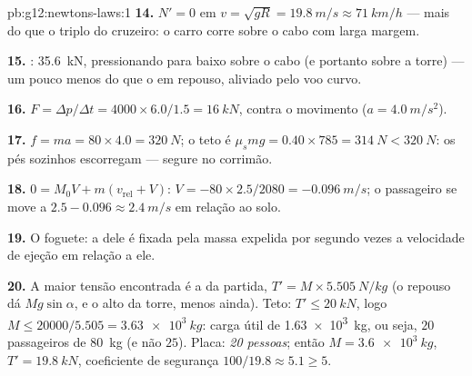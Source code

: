 \begin{solution}{pb:g12:newtons-laws:1}
\textbf{14.} $N' = 0$ em $v = \sqrt{gR} = \qty{19.8}{m/s} \approx
\qty{71}{km/h}$ --- mais do que o triplo do cruzeiro: o carro corre
sobre o cabo com larga margem.

\textbf{15.} : \qty{35.6}{kN}, pressionando para
baixo sobre o cabo (e portanto sobre a torre) --- um pouco menos do que
o  em repouso, aliviado pelo voo curvo.

\textbf{16.} $F = \Delta p/\Delta t = 4000 \times 6.0/1.5 =
\qty{16}{kN}$, contra o movimento ($a = \qty{4.0}{m/s^2}$).

\textbf{17.} $f = ma = 80 \times 4.0 = \qty{320}{N}$; o teto é
$\mu_s mg = 0.40 \times 785 = \qty{314}{N} < \qty{320}{N}$: os pés
sozinhos escorregam --- segure no corrimão.

\textbf{18.} $0 = M_0 V + m(v_{\text{rel}} + V)$:
$V = -80 \times 2.5/2080 = \qty{-0.096}{m/s}$; o passageiro se move a
$2.5 - 0.096 \approx \qty{2.4}{m/s}$ em relação ao solo.

\textbf{19.} O foguete: a  dele é fixada pela massa expelida
por segundo vezes a velocidade de ejeção em relação a ele.

\textbf{20.} A maior tensão encontrada é a da partida,
$T' = M \times \qty{5.505}{N/kg}$ (o repouso dá $Mg\sin\alpha$, e o alto
da torre, menos ainda). Teto: $T' \leq \qty{20}{kN}$, logo
$M \leq 20000/5.505 = \qty{3.63e3}{kg}$: carga útil de
\qty{1.63e3}{kg}, ou seja, $20$ passageiros de \qty{80}{kg} (e não
$25$). Placa: \emph{20 pessoas}; então $M = \qty{3.6e3}{kg}$,
$T' = \qty{19.8}{kN}$, coeficiente de segurança
$100/19.8 \approx 5.1 \geq 5$.
\end{solution}
